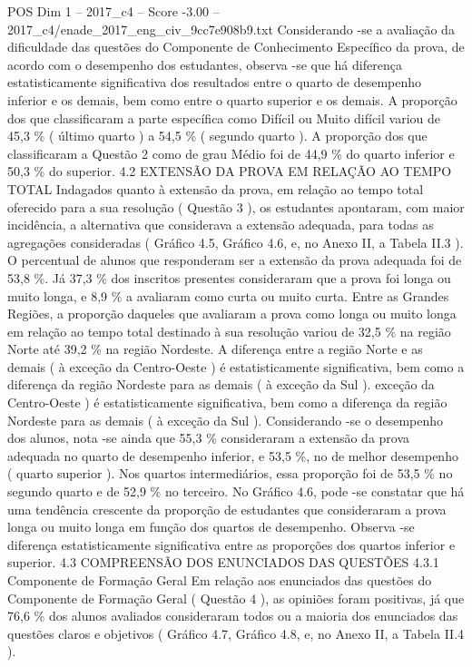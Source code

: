 \begin{textsample}{POS Dim 1 – 2017\_c4 – Score -3.00 – 2017\_c4/enade\_2017\_eng\_civ\_9cc7e908b9.txt}
Considerando -se a avaliação da dificuldade das questões do Componente de Conhecimento Específico da prova, de acordo com o desempenho dos estudantes, observa -se que há diferença estatisticamente significativa dos resultados entre o quarto de desempenho inferior e os demais, bem como entre o quarto superior e os demais.
A proporção dos que classificaram a parte específica como Difícil ou Muito difícil variou de 45,3 \% ( último quarto ) a 54,5 \% ( segundo quarto ).
A proporção dos que classificaram a Questão 2 como de grau Médio foi de 44,9 \% do quarto inferior e 50,3 \% do superior. 4.2 EXTENSÃO DA PROVA EM RELAÇÃO AO TEMPO TOTAL Indagados quanto à extensão da prova, em relação ao tempo total oferecido para a sua resolução ( Questão 3 ), os estudantes apontaram, com maior incidência, a alternativa que considerava a extensão adequada, para todas as agregações consideradas ( Gráfico 4.5, Gráfico 4.6, e, no Anexo II, a Tabela II.3 ).
O percentual de alunos que responderam ser a extensão da prova adequada foi de 53,8 \%.
Já 37,3 \% dos inscritos presentes consideraram que a prova foi longa ou muito longa, e 8,9 \% a avaliaram como curta ou muito curta.
Entre as Grandes Regiões, a proporção daqueles que avaliaram a prova como longa ou muito longa em relação ao tempo total destinado à sua resolução variou de 32,5 \% na região Norte até 39,2 \% na região Nordeste.
A diferença entre a região Norte e as demais ( à exceção da Centro-Oeste ) é estatisticamente significativa, bem como a diferença da região Nordeste para as demais ( à exceção da Sul ). exceção da Centro-Oeste ) é estatisticamente significativa, bem como a diferença da região Nordeste para as demais ( à exceção da Sul ).
Considerando -se o desempenho dos alunos, nota -se ainda que 55,3 \% consideraram a extensão da prova adequada no quarto de desempenho inferior, e 53,5 \%, no de melhor desempenho ( quarto superior ).
Nos quartos intermediários, essa proporção foi de 53,5 \% no segundo quarto e de 52,9 \% no terceiro.
No Gráfico 4.6, pode -se constatar que há uma tendência crescente da proporção de estudantes que consideraram a prova longa ou muito longa em função dos quartos de desempenho.
Observa -se diferença estatisticamente significativa entre as proporções dos quartos inferior e superior. 4.3 COMPREENSÃO DOS ENUNCIADOS DAS QUESTÕES 4.3.1 Componente de Formação Geral Em relação aos enunciados das questões do Componente de Formação Geral ( Questão 4 ), as opiniões foram positivas, já que 76,6 \% dos alunos avaliados consideraram todos ou a maioria dos enunciados das questões claros e objetivos ( Gráfico 4.7, Gráfico 4.8, e, no Anexo II, a Tabela II.4 ).

\end{textsample}
